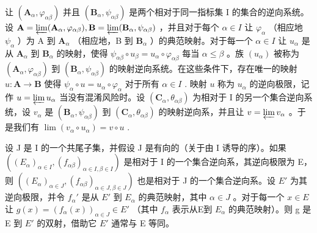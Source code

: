 让 \((\mathbf{A}_{\alpha},\varphi_{\alpha \beta})\) 并且 \((\mathbf{B}_{\alpha},\psi_{\alpha \beta})\) 是两个相对于同一指标集 I 的集合的逆向系统。设 \(\mathbf{A} = \varprojlim (\mathbf{A}_{\alpha},\varphi_{\alpha \beta}),\mathbf{B} = \varprojlim (\mathbf{B}_{\alpha},\psi_{\alpha \beta})\) ，并且对于每个 \(\alpha \in I\) 让 \(\varphi_{\alpha}\) （相应地 \(\psi_{\alpha}\) ）为 A 到 \(\mathbf{A}_{\alpha}\) （相应地，B 到 \(\mathbf{B}_{\alpha}\) ）的典范映射。对于每一个 \(\alpha \in I\) 让 \(u_{\alpha}\) 是从 \(\mathbf{A}_{\alpha}\) 到 \(\mathbf{B}_{\alpha}\) 的映射，使得 \(\psi_{\alpha \beta}\circ u_{\beta} = u_{\alpha}\circ \varphi_{\alpha \beta}\) 每当 \(\alpha \leqslant \beta\) 。族 \((u_{\alpha})\) 被称为 \((\mathbf{A}_{\alpha},\varphi_{\alpha \beta})\) 到 \((\mathbf{B}_{\alpha},\psi_{\alpha \beta})\) 的映射逆向系统。在这些条件下，存在唯一的映射 \(u:\mathbf{A}\to \mathbf{B}\) 使得 \(\psi_{\alpha}\circ u = u_{\alpha}\circ \varphi_{\alpha}\) 对于所有 \(\alpha \in I\) . 映射 \(u\) 称为 \(u_{\alpha}\) 的逆向极限，记作 \(u = \varprojlim u_{\alpha}\) 当没有混淆风险时。设 \((\mathbf{C}_{\alpha}, \theta_{\alpha\beta})\) 为相对于 I 的另一个集合逆向系统，设 \(v_{\alpha}\) 是 \((\mathbf{B}_{\alpha}, \psi_{\alpha\beta})\) 到 \((\mathbf{C}_{\alpha}, \theta_{\alpha\beta})\) 的映射逆向系，并且让 \(v = \varprojlim v_{\alpha}\) 。于是我们有 \(\lim (v_{\alpha} \circ u_{\alpha}) = v \circ u\) .

设 J 是 I 的一个共尾子集，并假设 J 是有向的（关于由 I 诱导的序）。如果 \(((E_{\alpha})_{\alpha\in I}, (f_{\alpha\beta})_{\alpha\in I,\beta\in I})\) 是相对于 I 的一个集合逆向系，其逆向极限为 E，则 \(((E_{\alpha})_{\alpha\in J}, (f_{\alpha\beta})_{\alpha\in J,\beta\in J})\) 也是相对于 J 的一个集合逆向系。设 \(E'\) 为其逆向极限，并令 \(f_{\alpha}'\) 是从 \(E'\) 到 \(E_{\alpha}\) 的典范映射，其中 \(\alpha\in J\) 。对于每一个 \(x\in E\) 让 \(g(x)=(f_{\alpha}(x))_{\alpha\in J}\in E'\) （其中 \(f_{\alpha}\) 表示从E到 \(E_{\alpha}\) 的典范映射）。则 g 是 E 到 \(E'\) 的双射，借助它 \(E'\) 通常与 E 等同。


